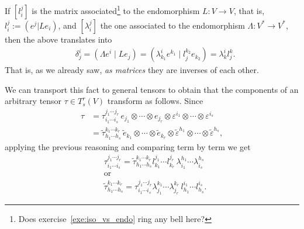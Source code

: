 If $[l_i^j]$ is the matrix associated\footnote{Does exercise~\ref{exe:iso_vs_endo} ring any bell here?} to the endomorphism $L: V \to V$, that is, $l_i^j := (e^j | L e_i)$, and $[\lambda_i^j]$ the one associated to the endomorphism $\Lambda: V^* \to V^*$, then the above translates into
\begin{align}
   & \delta_j^i = (\Lambda e^i \mid L e_j) = (\lambda_{k_1}^i e^{k_1} \mid l_j^{k_2} e_{k_2}) = \lambda_k^i l_j^k.
\end{align}
That is, as we already saw, \emph{as matrices} they are inverses of each other.

We can transport this fact to general tensors to obtain that the components of an arbitrary tensor $\tau\in T^r_s(V)$ transform as follows.
Since
\begin{align}
  \tau
   & =
  \tau^{j_1\cdots j_r}_{i_1\cdots i_s} \, e_{j_1}\otimes\cdots\otimes e_{j_r}\otimes \varepsilon^{i_1}\otimes \cdots\otimes \varepsilon^{i_s}                                                           \\
   & = \widetilde\tau^{k_1\cdots k_r}_{h_1\cdots h_s} \, \widetilde e_{k_1}\otimes\cdots\otimes \widetilde e_{k_r}\otimes \widetilde\varepsilon^{h_1}\otimes \cdots\otimes \widetilde\varepsilon^{h_s},
\end{align}
applying the previous reasoning and comparing term by term we get
\begin{align}
   & \tau^{j_1\cdots j_r}_{i_1\cdots i_s} = \widetilde\tau^{k_1\cdots k_r}_{h_1\cdots h_s} l_{k_1}^{j_1}\cdots l_{k_r}^{j_r}\, \lambda_{i_1}^{h_1}\cdots \lambda_{i_s}^{h_s}  \\
   & \mbox{or}                                                                                                                                                                \\
   & \widetilde\tau^{k_1\cdots k_r}_{h_1\cdots h_s} = \tau^{j_1\cdots j_r}_{i_1\cdots i_s} \lambda_{j_1}^{k_1}\cdots \lambda_{j_r}^{k_r}\, l_{h_1}^{i_1}\cdots l_{h_s}^{i_s}.
\end{align}

